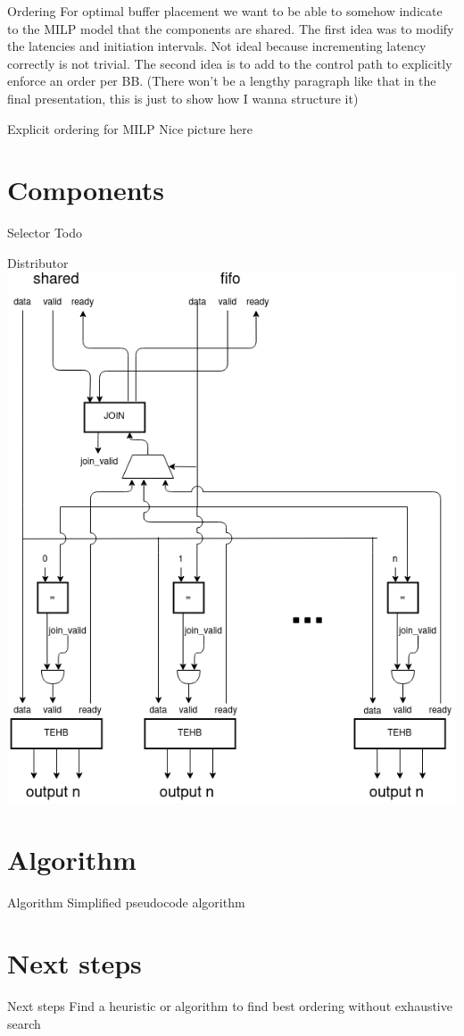 \documentclass{beamer}
\begin{document}
\begin{frame}{Ordering}
For optimal buffer placement we want to be able to somehow indicate to the MILP model that the components are shared. The first idea was to modify the latencies and initiation intervals. Not ideal because incrementing latency correctly is not trivial. The second idea is to add to the control path to explicitly enforce an order per BB. (There won't be a lengthy paragraph like that in the final presentation, this is just to show how I wanna structure it)
\end{frame}

\begin{frame}{Explicit ordering for MILP}
Nice picture here
\end{frame}

\section{Components}
\begin{frame}{Selector}
Todo
\end{frame}

\begin{frame}{Distributor}
    \includegraphics[scale=0.35]{distributor.png}
\end{frame}

\section{Algorithm}
\begin{frame}{Algorithm}
Simplified pseudocode algorithm
\end{frame}

\section{Next steps}
\begin{frame}{Next steps}
Find a heuristic or algorithm to find best ordering without exhaustive search
\end{frame}
\end{document}
